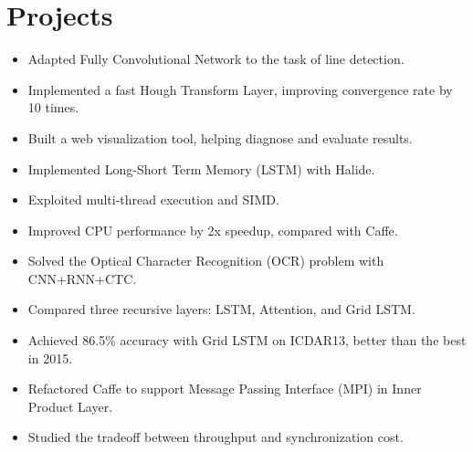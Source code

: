 \documentclass[letterpaper,11pt]{article}
\begin{document}
\section*{Projects}

\begin{itemize}
  \begin{itemize}
  \item Adapted Fully Convolutional Network to the task of line detection.
  \item Implemented a fast Hough Transform Layer, improving convergence rate by 10 times.
  \item Built a web visualization tool, helping diagnose and evaluate results.
  \end{itemize}
  \begin{itemize}
  \item Implemented Long-Short Term Memory (LSTM) with Halide.
  \item Exploited multi-thread execution and SIMD.
  \item Improved CPU performance by 2x speedup, compared with Caffe.  \end{itemize}
  \begin{itemize}
  \item Solved the Optical Character Recognition (OCR) problem with CNN+RNN+CTC.
  \item Compared three recursive layers: LSTM, Attention, and Grid LSTM.
  \item Achieved 86.5\% accuracy with Grid LSTM on ICDAR13, better than the best in 2015.
  \end{itemize}
  \begin{itemize}
  \item Refactored Caffe to support Message Passing Interface (MPI) in Inner Product Layer.
  \item Studied the tradeoff between throughput and synchronization cost.
  \end{itemize}
\end{itemize}
\end{document}
